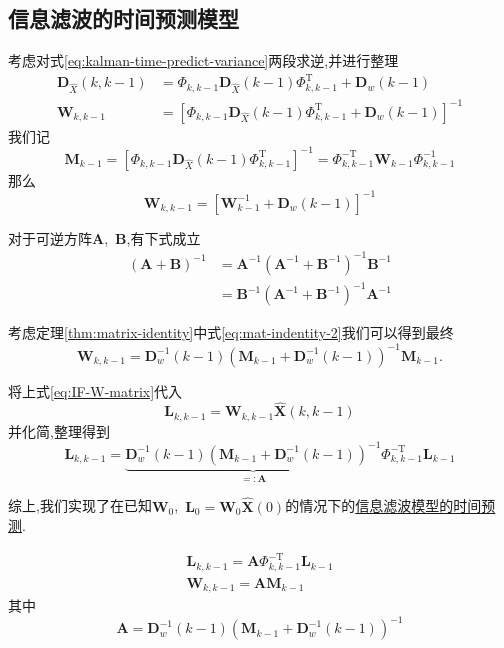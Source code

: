\documentclass[cn,10pt,citestyle=gb7714-2015,bibstyle=gb7714-2015]{elegantbook}
\newcommand{\mT}{\mathrm{T}}
\begin{document}
\subsection{信息滤波的时间预测模型}
考虑对式\ref{eq:kalman-time-predict-variance}两段求逆,并进行整理
\begin{align*}
  \bm{D}_{\hat{X}}(k,k-1)&=\bm{\varPhi}_{k,k-1}\bm{D}_{\hat{X}}(k-1)\bm{\varPhi}_{k,k-1}^\mT+\bm{D}_w(k-1)\\
  \bm{W}_{k,k-1}&=\left[\bm{\varPhi}_{k,k-1}\bm{D}_{\hat{X}}(k-1)\bm{\varPhi}_{k,k-1}^\mT+\bm{D}_w(k-1)\right]^{-1}
\end{align*}
我们记
\begin{equation}
  \bm{M}_{k-1}=\left[\bm{\varPhi}_{k,k-1}\bm{D}_{\hat{X}}(k-1)\bm{\varPhi}_{k,k-1}^\mT\right]^{-1}=\bm{\varPhi}_{k,k-1}^{-\mT}\bm{W}_{k-1}\bm{\varPhi}_{k,k-1}^{-1}
\end{equation}
那么
\begin{equation}
  \bm{W}_{k,k-1}=\left[\bm{W}_{k-1}^{-1}+\bm{D}_w(k-1)\right]^{-1}
\end{equation}
\begin{theorem}[重要矩阵恒等式]\label{thm:matrix-identity}
  对于可逆方阵$\bm{A}$,\ $\bm{B}$,有下式成立
  \begin{align}
    (\bm{A}+\bm{B})^{-1}&=\bm{A}^{-1}(\bm{A}^{-1}+\bm{B}^{-1})^{-1}\bm{B}^{-1}\label{eq:mat-indentity-1}\\
    &=\bm{B}^{-1}(\bm{A}^{-1}+\bm{B}^{-1})^{-1}\bm{A}^{-1}\label{eq:mat-indentity-2}
  \end{align}
\end{theorem}
考虑定理\ref{thm:matrix-identity}中式\eqref{eq:mat-indentity-2}我们可以得到最终
\begin{equation}\label{eq:IF-W-matrix}
  \bm{W}_{k,k-1}=\bm{D}_w^{-1}(k-1)\left(\bm{M}_{k-1}+\bm{D}_w^{-1}(k-1)\right)^{-1}\bm{M}_{k-1}.
\end{equation}

将上式\eqref{eq:IF-W-matrix}代入
\[
  \bm{L}_{k,k-1}=\bm{W}_{k,k-1}\hat{\bm{X}}(k,k-1)
\]
并化简,整理得到
\begin{equation}
  \bm{L}_{k,k-1}=\underbrace{\bm{D}_w^{-1}(k-1)\left(\bm{M}_{k-1}+\bm{D}_w^{-1}(k-1)\right)^{-1}}_{=:\bm{A}}\bm{\varPhi}_{k,k-1}^{-\mT}\bm{L}_{k-1}
\end{equation}

综上,我们实现了在已知$\bm{W}_0$,\ $\bm{L}_0=\bm{W}_0\hat{\bm{X}}(0)$的情况下的\uline{信息滤波模型的时间预测}.
\begin{theorem}[信息滤波的时间预测模型]\label{thm:information-kalman-time-predict}
  \begin{gather}
    \bm{L}_{k,k-1}=\bm{A}\bm{\varPhi}^{-\mT}_{k,k-1}\bm{L}_{k-1}\\
    \bm{W}_{k,k-1}=\bm{A}\bm{M}_{k-1}
  \end{gather}
  其中
  \begin{equation}
    \bm{A}=\bm{D}_w^{-1}(k-1)\left(\bm{M}_{k-1}+\bm{D}_w^{-1}(k-1)\right)^{-1}
  \end{equation}
\end{theorem}
\end{document}
